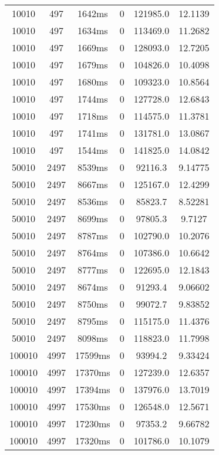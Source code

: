 \documentclass[./main.tex]{subfiles}
\begin{document}
\begin{table}
\begin{tabular}{ c | c | c | c | c | c }
        10010 & 497 & 1642ms & 0 & 121985.0 & 12.1139 \\
        10010 & 497 & 1634ms & 0 & 113469.0 & 11.2682 \\
        10010 & 497 & 1669ms & 0 & 128093.0 & 12.7205 \\
        10010 & 497 & 1679ms & 0 & 104826.0 & 10.4098 \\
        10010 & 497 & 1680ms & 0 & 109323.0 & 10.8564 \\
        10010 & 497 & 1744ms & 0 & 127728.0 & 12.6843 \\
        10010 & 497 & 1718ms & 0 & 114575.0 & 11.3781 \\
        10010 & 497 & 1741ms & 0 & 131781.0 & 13.0867 \\
        10010 & 497 & 1544ms & 0 & 141825.0 & 14.0842 \\
        \hline
        50010 & 2497 & 8539ms & 0 & 92116.3 & 9.14775 \\
        50010 & 2497 & 8667ms & 0 & 125167.0 & 12.4299 \\
        50010 & 2497 & 8536ms & 0 & 85823.7 & 8.52281 \\
        50010 & 2497 & 8699ms & 0 & 97805.3 & 9.7127 \\
        \rowcolor{lightgray} 50010 & 2497 & 8787ms & 0 & 102790.0 & 10.2076 \\
        50010 & 2497 & 8764ms & 0 & 107386.0 & 10.6642 \\
        50010 & 2497 & 8777ms & 0 & 122695.0 & 12.1843 \\
        50010 & 2497 & 8674ms & 0 & 91293.4 & 9.06602 \\
        50010 & 2497 & 8750ms & 0 & 99072.7 & 9.83852 \\
        50010 & 2497 & 8795ms & 0 & 115175.0 & 11.4376 \\
        50010 & 2497 & 8098ms & 0 & 118823.0 & 11.7998 \\
        \hline
        100010 & 4997 & 17599ms & 0 & 93994.2 & 9.33424 \\
        100010 & 4997 & 17370ms & 0 & 127239.0 & 12.6357 \\
        100010 & 4997 & 17394ms & 0 & 137976.0 & 13.7019 \\
        100010 & 4997 & 17530ms & 0 & 126548.0 & 12.5671 \\
        100010 & 4997 & 17230ms & 0 & 97353.2 & 9.66782 \\
        \rowcolor{lightgray} 100010 & 4997 & 17320ms & 0 & 101786.0 & 10.1079 \\

\end{tabular}
\end{table}
\end{document}
